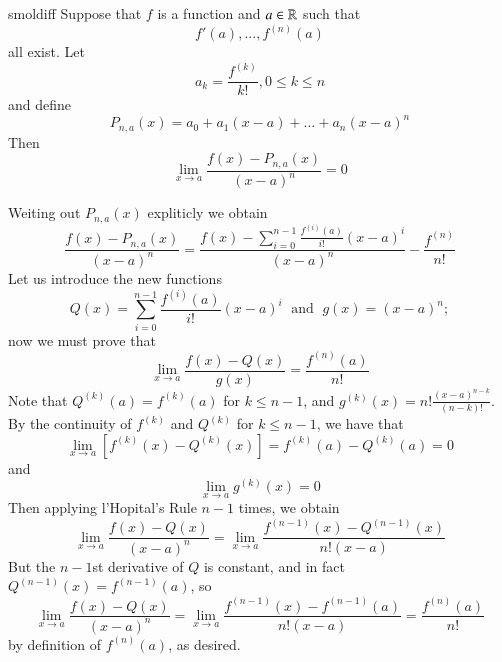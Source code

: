 \documentclass[12pt]{report}
\begin{document}
\begin{thm}{}{smoldiff}
    Suppose that $f$ is a function and $a \in \mathbb R$ such that \begin{equation*}
        f'(a),...,f^{(n)}(a)
    \end{equation*}
    all exist. Let \begin{equation*}
        a_k = \frac{f^{(k)}}{k!}, 0\leq k \leq n
    \end{equation*}
    and define \begin{equation*}
        P_{n,a}(x) = a_0 + a_1(x-a) + \hdots + a_n(x-a)^n
    \end{equation*}
    Then \begin{equation*}
        \lim\limits_{x\rightarrow a}\frac{f(x)-P_{n,a}(x)}{(x-a)^n} = 0
    \end{equation*}
\end{thm}
\begin{proof*}{}{}
    Weiting out $P_{n,a}(x)$ expliticly we obtain \begin{equation*}
        \frac{f(x) - P_{n,a}(x)}{(x-a)^n} = \frac{f(x) - \sum\limits_{i=0}^{n-1}\frac{f^{(i)}(a)}{i!}(x-a)^i}{(x-a)^n} - \frac{f^{(n)}}{n!}
    \end{equation*}
    Let us introduce the new functions \begin{equation*}
        Q(x) = \sum\limits_{i=0}^{n-1}\frac{f^{(i)}(a)}{i!}(x-a)^i\;\text{ and }\; g(x) = (x-a)^n;
    \end{equation*}
    now we must prove that \begin{equation*}
        \lim\limits_{x\rightarrow a}\frac{f(x) - Q(x)}{g(x)} = \frac{f^{(n)}(a)}{n!}
    \end{equation*}
    Note that $Q^{(k)}(a) = f^{(k)}(a)$ for $k \leq n-1$, and $g^{(k)}(x) =n!\frac{(x-a)^{n-k}}{(n-k)!}$. By the continuity of $f^{(k)}$ and $Q^{(k)}$ for $k \leq n-1$, we have that \begin{equation*}
        \lim\limits_{x\rightarrow a}\left[f^{(k)}(x) - Q^{(k)}(x)\right] = f^{(k)}(a) - Q^{(k)}(a) = 0
    \end{equation*}
    and \begin{equation*}
        \lim\limits_{x\rightarrow a}g^{(k)}(x) = 0
    \end{equation*}
    Then applying l'Hopital's Rule $n-1$ times, we obtain \begin{equation*}
        \lim\limits_{x\rightarrow a}\frac{f(x)-Q(x)}{(x-a)^n} = \lim\limits_{x\rightarrow a}\frac{f^{(n-1)}(x) - Q^{(n-1)}(x)}{n!(x-a)}
    \end{equation*}
    But the $n-1$st derivative of $Q$ is constant, and in fact $Q^{(n-1)}(x) = f^{(n-1)}(a)$, so \begin{equation*}
        \lim\limits_{x\rightarrow a}\frac{f(x)-Q(x)}{(x-a)^n} = \lim\limits_{x\rightarrow a}\frac{f^{(n-1)}(x)-f^{(n-1)}(a)}{n!(x-a)} = \frac{f^{(n)}(a)}{n!}
    \end{equation*}
    by definition of $f^{(n)}(a)$, as desired.
\end{proof*}
\end{document}
